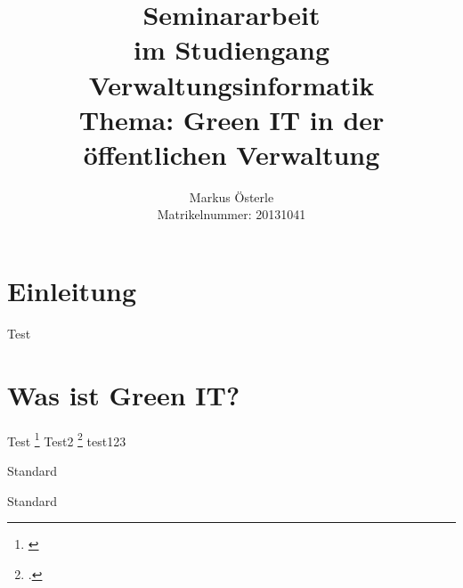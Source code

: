 \documentclass[12pt,a4paper]{report}
\author{Markus Österle \\
Matrikelnummer: 20131041}
\title{Seminararbeit \\ im Studiengang \\ Verwaltungsinformatik \\ Thema: \linebreak Green IT in der öffentlichen Verwaltung}
\begin{document}
\maketitle
\tableofcontents
\newpage
\chapter{Einleitung}
Test
\chapter{Was ist Green IT?}
Test \cite{ta1} \footnote{\cite{ta1}}
\newpage
Test2 \cite{ta2} \footcite{ta1}
test123


Standard


\textsf{Standard}

\newpage
\layout
\printbibliography 
\end{document}
